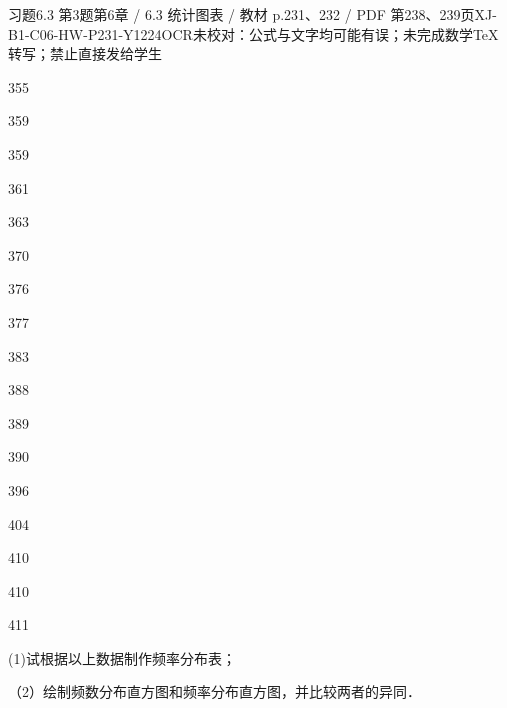 \begin{bankitem}{习题6.3 第3题}{第6章 / 6.3 统计图表 / 教材 p.231、232 / PDF 第238、239页}{XJ-B1-C06-HW-P231-Y1224}{OCR未校对：公式与文字均可能有误；未完成数学TeX转写；禁止直接发给学生}
\begin{ocrdraft}
355
\par
359
\par
359
\par
361
\par
363
\par
370
\par
376
\par
377
\par
383
\par
388
\par
389
\par
390
\par
396
\par
404
\par
410
\par
410
\par
411
\par
(1)试根据以上数据制作频率分布表；
\par
[教材p.232 / PDF第239页]
\par
（2）绘制频数分布直方图和频率分布直方图，并比较两者的异同．
\end{ocrdraft}
\end{bankitem}
